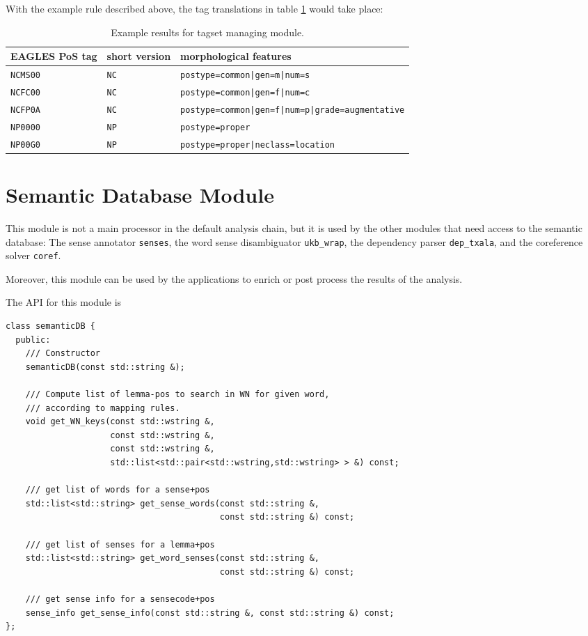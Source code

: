 \documentclass[a4paper]{book}
\begin{document}
\begin{itemize}
    With the example rule described above, the tag translations in table
    \ref{tr-tags} would take place:
\begin{table}[htb] \center
\begin{tabular}{|l|ll|} 
 EAGLES PoS tag & short version & morphological features \\ \hline
 \verb#NCMS00#   & \verb#NC# & \verb#postype=common|gen=m|num=s# \\
 \verb#NCFC00#   & \verb#NC# & \verb#postype=common|gen=f|num=c# \\
 \verb#NCFP0A#   & \verb#NC# & \verb#postype=common|gen=f|num=p|grade=augmentative# \\
 \verb#NP0000#   & \verb#NP# & \verb#postype=proper# \\
 \verb#NP00G0#   & \verb#NP# & \verb#postype=proper|neclass=location# \\ \hline
\end{tabular}
\label{tr-tags}
\caption{Example results for tagset managing module.}
\end{table}

\end{itemize}

\section{Semantic Database Module}
\label{semdb}

  This module is not a main processor in the default analysis chain,
  but it is used by the other modules that need access
  to the semantic database: The sense annotator {\tt senses}, the word sense 
  disambiguator {\tt ukb\_wrap}, the
  dependency parser {\tt dep\_txala}, and the coreference solver {\tt coref}.

  Moreover, this module can be used by the applications to enrich or 
  post process the results of the analysis.
  
  The API for this module is 

\begin{verbatim}
class semanticDB {
  public:
    /// Constructor
    semanticDB(const std::string &); 

    /// Compute list of lemma-pos to search in WN for given word,
    /// according to mapping rules.
    void get_WN_keys(const std::wstring &, 
                     const std::wstring &, 
                     const std::wstring &,
                     std::list<std::pair<std::wstring,std::wstring> > &) const;

    /// get list of words for a sense+pos
    std::list<std::string> get_sense_words(const std::string &, 
                                           const std::string &) const;

    /// get list of senses for a lemma+pos
    std::list<std::string> get_word_senses(const std::string &, 
                                           const std::string &) const;

    /// get sense info for a sensecode+pos
    sense_info get_sense_info(const std::string &, const std::string &) const;
};
\end{verbatim}
\end{document}
